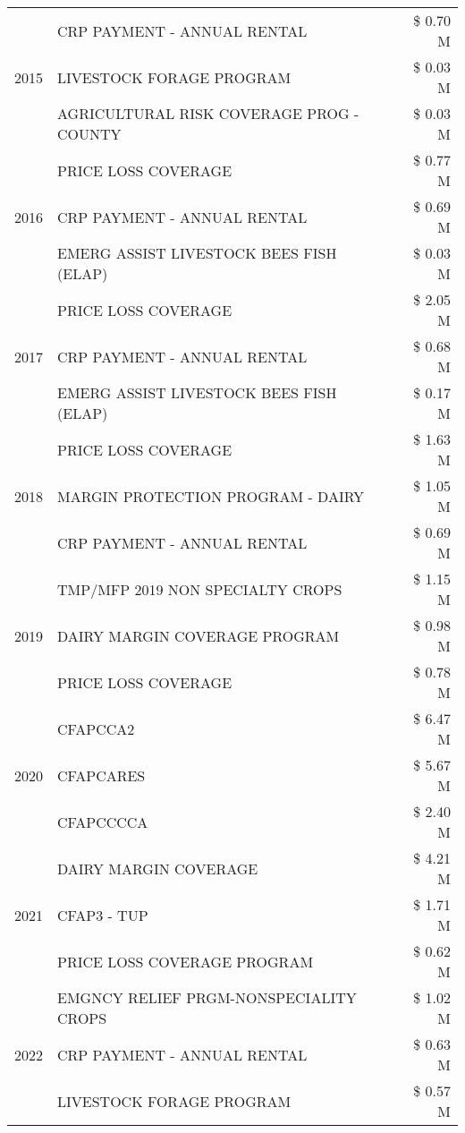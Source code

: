 \begin{tabular}{llr}
\cline{1-3}
\multirow[t]{3}{*}{2015} & CRP PAYMENT - ANNUAL RENTAL & \$ 0.70 M \\
 & LIVESTOCK FORAGE PROGRAM & \$ 0.03 M \\
 & AGRICULTURAL RISK COVERAGE PROG - COUNTY & \$ 0.03 M \\
\cline{1-3}
\multirow[t]{3}{*}{2016} & PRICE LOSS COVERAGE & \$ 0.77 M \\
 & CRP PAYMENT - ANNUAL RENTAL & \$ 0.69 M \\
 & EMERG ASSIST LIVESTOCK BEES FISH (ELAP) & \$ 0.03 M \\
\cline{1-3}
\multirow[t]{3}{*}{2017} & PRICE LOSS COVERAGE & \$ 2.05 M \\
 & CRP PAYMENT - ANNUAL RENTAL & \$ 0.68 M \\
 & EMERG ASSIST LIVESTOCK BEES FISH (ELAP) & \$ 0.17 M \\
\cline{1-3}
\multirow[t]{3}{*}{2018} & PRICE LOSS COVERAGE & \$ 1.63 M \\
 & MARGIN PROTECTION PROGRAM - DAIRY & \$ 1.05 M \\
 & CRP PAYMENT - ANNUAL RENTAL & \$ 0.69 M \\
\cline{1-3}
\multirow[t]{3}{*}{2019} & TMP/MFP 2019 NON SPECIALTY CROPS & \$ 1.15 M \\
 & DAIRY MARGIN COVERAGE PROGRAM & \$ 0.98 M \\
 & PRICE LOSS COVERAGE & \$ 0.78 M \\
\cline{1-3}
\multirow[t]{3}{*}{2020} & CFAPCCA2 & \$ 6.47 M \\
 & CFAPCARES & \$ 5.67 M \\
 & CFAPCCCCA & \$ 2.40 M \\
\cline{1-3}
\multirow[t]{3}{*}{2021} & DAIRY MARGIN COVERAGE & \$ 4.21 M \\
 & CFAP3 - TUP & \$ 1.71 M \\
 & PRICE LOSS COVERAGE PROGRAM & \$ 0.62 M \\
\cline{1-3}
\multirow[t]{3}{*}{2022} & EMGNCY RELIEF PRGM-NONSPECIALITY CROPS & \$ 1.02 M \\
 & CRP PAYMENT - ANNUAL RENTAL & \$ 0.63 M \\
 & LIVESTOCK FORAGE PROGRAM & \$ 0.57 M \\
\cline{1-3}
\bottomrule
\end{tabular}

